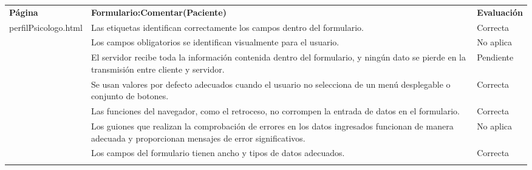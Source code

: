 \clearpage

\begin{table}[htpb]
\centering
\begin{tabularx}{\textwidth}{|l|X|l|}
\hline
\rowcolor[gray]{0.9}\multicolumn{3}{|l|}{\textbf{Anexo PI-010}}                                                                                                                                                                               \\ \hline
\textbf{Página}                        & \textbf{Formulario:Comentar(Paciente)}                                                                                                                    & \textbf{Evaluación} \\ \hline
\multirow{10}{*}{perfilPsicologo.html} & Las etiquetas identifican correctamente los campos dentro del formulario.                                                                                 & Correcta            \\ \cline{2-3} 
                                       & Los campos obligatorios se identifican visualmente para el usuario.                                                                                       & No aplica           \\ \cline{2-3} 
                                       & El servidor recibe toda la información contenida dentro del formulario, y ningún dato se pierde en la transmisión entre cliente y servidor.               & Pendiente           \\ \cline{2-3} 
                                       & Se usan valores por defecto adecuados cuando el usuario no selecciona de un menú desplegable o conjunto de botones.                                       & Correcta            \\ \cline{2-3} 
                                       & Las funciones del navegador, como el retroceso, no corrompen la entrada de datos en el formulario.                                                        & Correcta            \\ \cline{2-3} 
                                       & Los guiones que realizan la comprobación de errores en los datos ingresados funcionan de manera adecuada y proporcionan mensajes de error significativos. & No aplica           \\ \cline{2-3} 
                                       & Los campos del formulario tienen ancho y tipos de datos adecuados.                                                                                        & Correcta            \\ \cline{2-3} 

\end{tabularx}
\end{table}
